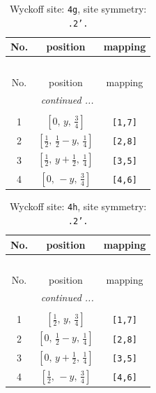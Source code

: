 \documentclass[fleqn,8pt]{jsarticle}
\begin{document}
\renewcommand{\arraystretch}{1.2}
\begin{longtable}{ccc}
\caption{Wyckoff site: {\tt 4g}, site symmetry: {\tt .2'.}}
 \\
 \hline \hline
No. & position & mapping \\ \hline \endfirsthead

\multicolumn{2}{l}{\tablename\ \thetable{}} \\
 \hline \hline
No. & position & mapping \\ \hline \endhead

 \hline \hline
\multicolumn{2}{r}{\footnotesize\it continued ...} \\ \endfoot

 \hline \hline
\multicolumn{2}{r}{} \\ \endlastfoot

1 & $\left[ 0,\, y,\, \frac{3}{4} \right]$ & {\tt [1,7]} \\ \hline
2 & $\left[ \frac{1}{2},\, \frac{1}{2} - y,\, \frac{1}{4} \right]$ & {\tt [2,8]} \\ \hline
3 & $\left[ \frac{1}{2},\, y + \frac{1}{2},\, \frac{1}{4} \right]$ & {\tt [3,5]} \\ \hline
4 & $\left[ 0,\, - y,\, \frac{3}{4} \right]$ & {\tt [4,6]} \\
\end{longtable}
\renewcommand{\arraystretch}{1.2}
\begin{longtable}{ccc}
\caption{Wyckoff site: {\tt 4h}, site symmetry: {\tt .2'.}}
 \\
 \hline \hline
No. & position & mapping \\ \hline \endfirsthead

\multicolumn{2}{l}{\tablename\ \thetable{}} \\
 \hline \hline
No. & position & mapping \\ \hline \endhead

 \hline \hline
\multicolumn{2}{r}{\footnotesize\it continued ...} \\ \endfoot

 \hline \hline
\multicolumn{2}{r}{} \\ \endlastfoot

1 & $\left[ \frac{1}{2},\, y,\, \frac{3}{4} \right]$ & {\tt [1,7]} \\ \hline
2 & $\left[ 0,\, \frac{1}{2} - y,\, \frac{1}{4} \right]$ & {\tt [2,8]} \\ \hline
3 & $\left[ 0,\, y + \frac{1}{2},\, \frac{1}{4} \right]$ & {\tt [3,5]} \\ \hline
4 & $\left[ \frac{1}{2},\, - y,\, \frac{3}{4} \right]$ & {\tt [4,6]} \\
\end{longtable}
\end{document}
